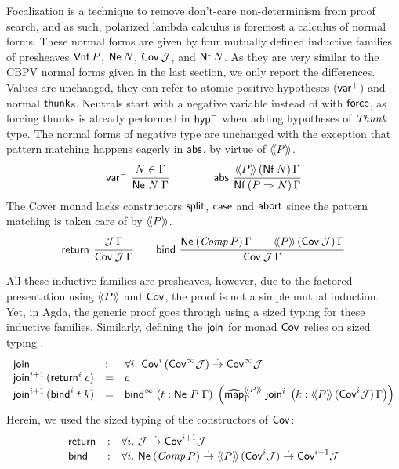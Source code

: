 \documentclass[sigplan,screen]{acmart}
\begin{document}
Focalization is a technique to remove don't-care non-determinism from
proof search, and as such, polarized lambda calculus is foremost a
calculus of normal forms.
These normal forms are given by four mutually defined inductive
families of presheaves $\tVnf\,P$,
$\tNe\,N$, $\Cov\,\J$,
and $\tNf\,N$.  As they are very similar to the CBPV normal forms
given in the last section, we only report the differences.
%
Values  are unchanged, they can refer to
atomic positive hypotheses ($\pvar$) and normal $\tthunk$s.
%
Neutrals  start with a negative variable instead
of with $\tforce$, as forcing thunks is already performed in $\nhyp$
when adding hypotheses of $\tThunk$ type.
%
The normal forms  of negative type are unchanged
with the exception that pattern matching happens eagerly in $\tabs$,
by virtue of $\Add P$.
\[
  \nru{\nvar}{N \in \Gamma}{\Ne N \Gamma}
\qquad
\qquad
  \nru{\tabs}
      {\AddHypP P {\tNf\, N} \Gamma}
      {\NfP {P \To N} \Gamma}
\]
%
The Cover monad \fbox{$\Cover \J \Gamma$}
lacks constructors $\tsplit$, $\tcase$ and $\tabort$
since the pattern matching is taken care of by $\Add P$.
\begin{gather*}
  \nru{\treturn}{\J\,\Gamma}{\Cover \J \Gamma}
\qquad
  \nru{\tbind}
      {\NeP {\Comp P} \Gamma \qquad \AddHypP P {\Cov\,\J} \Gamma}
      {\Cover \J \Gamma}
\end{gather*}


All these inductive families are presheaves, however, due to the factored
presentation using $\Add P$ and $\Cov$, the proof is not a simple
mutual induction.  Yet, in Agda, the generic proof goes through using a sized
typing for these inductive families.  Similarly, defining the
$\tjoin$ for monad $\Cov$ relies on sized typing \cite{abel:PhD}.
\[
\begin{array}{lll}
  \tjoin & : & \forall i.\
    \Cov[i]\,(\Cov[\infty]\J) \todot \Cov[\infty]\J  \\
  \tjoin[i+1]\,(\treturn[i]\;c) & = & c \\
  \tjoin[i+1]\,(\tbind^i\;t\;k)
    & = & \tbind^\infty\;
     (t : \Ne P \Gamma)\;
     \left(\stmap[\Add P]_\Gamma\;\tjoin[i]\;
       \left(k : \AddHypP P {\Cov[i]\J} \Gamma
       \right)
     \right)
\end{array}
\]
Herein, we used the sized typing of the constructors of $\Cov$:
\[
\begin{array}{lll}
  \treturn & : & \forall i.\ \J \todot \Cov[i+1] \J \\
  \tbind  & : & \forall i.\
    \tNe\,(\Comp P) \todot \Add P\,(\Cov[i]\J) \todot \Cov[i+1]\J \\
\end{array}
\]
\end{document}
